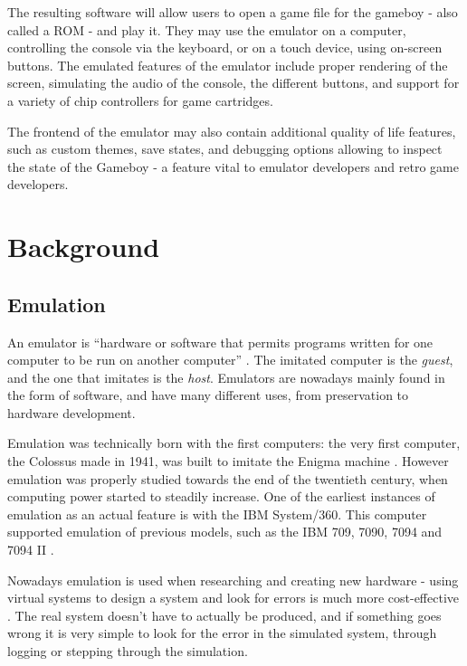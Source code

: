 \documentclass[11pt]{report}
\begin{document}
The resulting software will allow users to open a game file for the gameboy - also called a ROM - and play it. They may use the emulator on a computer, controlling the console via the keyboard, or on a touch device, using on-screen buttons. The emulated features of the emulator include proper rendering of the screen, simulating the audio of the console, the different buttons, and support for a variety of chip controllers for game cartridges.

The frontend of the emulator may also contain additional quality of life features, such as custom themes, save states, and debugging options allowing to inspect the state of the Gameboy - a feature vital to emulator developers and retro game developers.

\chapter{Background}

\section{Emulation}

An emulator is ``hardware or software that permits programs written for one computer to be run on another computer'' \cite{emulator_def}. The imitated computer is the \textit{guest}, and the one that imitates is the \textit{host}. Emulators are nowadays mainly found in the form of software, and have many different uses, from preservation to hardware development.

Emulation was technically born with the first computers: the very first computer, the Colossus made in 1941, was built to imitate the Enigma machine \cite{emulator_origin}. However emulation was properly studied towards the end of the twentieth century, when computing power started to steadily increase. One of the earliest instances of emulation as an actual feature is with the IBM System/360. This computer supported emulation of previous models, such as the IBM 709, 7090, 7094 and 7094 II \cite{ibm_emulation}.

Nowadays emulation is used when researching and creating new hardware - using virtual systems to design a system and look for errors is much more cost-effective \cite{emu_in_design}. The real system doesn't have to actually be produced, and if something goes wrong it is very simple to look for the error in the simulated system, through logging or stepping through the simulation.
\end{document}

